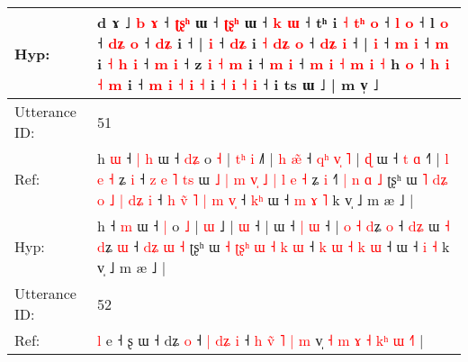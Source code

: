 \documentclass[10pt]{article}
\DeclareRobustCommand{\hl}[1]{{\textcolor{red}{#1}}}
\begin{document}
\begin{longtable}{ll}
Hyp: & d\hl{}\hl{}\hl{}\hl{}\hl{}\hl{} \hl{}ɤ\hl{}\hl{}\hl{}\hl{}\hl{}\hl{}\hl{}\hl{}\hl{}\hl{}\hl{}\hl{}\hl{} ˩\hl{}\hl{} \hl{b} \hl{}\hl{ɤ} ˧\hl{}\hl{}\hl{}\hl{}\hl{}\hl{}\hl{}\hl{} \hl{ʈ}\hl{ʂ}\hl{ʰ} ɯ ˧ \hl{ʈ}\hl{ʂ}\hl{ʰ} ɯ ˧ \hl{}\hl{k} \hl{ɯ} ˧\hl{}\hl{} tʰ i \hl{}\hl{˧} \hl{}\hl{t}\hl{ʰ} \hl{}\hl{o} ˧ \hl{l} \hl{o} ˧\hl{}\hl{} l \hl{o} ˧ \hl{d}\hl{ʑ} \hl{}\hl{o} ˧ \hl{d}\hl{ʑ} i ˧ | \hl{i} ˧ \hl{d}\hl{ʑ} i\hl{} \hl{˧} \hl{}\hl{d}\hl{ʑ} \hl{}\hl{o} ˧ \hl{d}\hl{ʑ} \hl{i} ˧ |\hl{}\hl{}\hl{}\hl{} \hl{i} ˧ \hl{m} \hl{i} ˧ \hl{m} i\hl{}\hl{} \hl{˧} \hl{h} \hl{i} ˧ \hl{}\hl{m} \hl{}\hl{i} ˧ z\hl{}\hl{} \hl{i} \hl{˧} \hl{m} i\hl{} ˧ \hl{m} \hl{i} ˧ \hl{m} \hl{i} \hl{˧} \hl{m} \hl{}\hl{i} \hl{˧} h\hl{}\hl{}\hl{}\hl{}\hl{}\hl{}\hl{}\hl{} \hl{o} ˧\hl{}\hl{} \hl{h} \hl{i} \hl{˧} \hl{m} i ˧ \hl{m} \hl{i} \hl{˧} \hl{i} \hl{}\hl{˧} i \hl{}\hl{˧} \hl{i} \hl{˧} \hl{i} ˧\hl{}\hl{} i\hl{}\hl{} ts ɯ ˩ | m v̩ ˩
 \\
\midrule
Utterance ID: & 51 \\
Ref: & h\hl{ }\hl{ɯ} ˧\hl{ }\hl{|} \hl{h} ɯ ˧ \hl{d}\hl{ʑ} o \hl{˧} |\hl{ }\hl{t}\hl{ʰ} \hl{i} ˩\hl{˥} |\hl{ }\hl{h} \hl{æ}\hl{̃} ˧\hl{ }\hl{q}\hl{ʰ}\hl{ }\hl{v}\hl{̩}\hl{ }\hl{˥} |\hl{ }\hl{ɖ} ɯ ˧ \hl{t} \hl{ɑ} ˧\hl{˥} | \hl{l} \hl{e} \hl{˧}\hl{ }ʑ \hl{i} ˧\hl{ }\hl{z}\hl{ }\hl{e}\hl{ }\hl{˥} \hl{t}\hl{s} ɯ\hl{ }\hl{˩}\hl{ }\hl{|}\hl{ }\hl{m}\hl{ }\hl{v}\hl{̩}\hl{ }\hl{˩}\hl{ }\hl{|}\hl{ }\hl{l} \hl{e} \hl{˧}\hl{ }ʑ \hl{i} ˧\hl{˥} \hl{|}\hl{ }\hl{n} \hl{ɑ} \hl{˩} ʈʂʰ ɯ \hl{˥} \hl{d}\hl{ʑ}\hl{ }\hl{o} \hl{˩} \hl{|} \hl{d}\hl{ʑ} \hl{i} ˧\hl{ }\hl{h} \hl{v}\hl{̃} \hl{˥} \hl{|} \hl{m} \hl{v}\hl{̩} ˧\hl{ }\hl{k}\hl{ʰ} ɯ ˧\hl{ }\hl{m} \hl{ɤ} \hl{˥} k v̩ ˩ m æ ˩ |
 \\
Hyp: & h\hl{}\hl{} ˧\hl{}\hl{} \hl{m} ɯ ˧ \hl{}\hl{|} o \hl{˩} |\hl{}\hl{}\hl{} \hl{ɯ} ˩\hl{} |\hl{}\hl{} \hl{}\hl{ɯ} ˧\hl{}\hl{}\hl{}\hl{}\hl{}\hl{}\hl{}\hl{} |\hl{}\hl{} ɯ ˧ \hl{|} \hl{ɯ} ˧\hl{} | \hl{o} \hl{˧} \hl{}\hl{d}ʑ \hl{o} ˧\hl{}\hl{}\hl{}\hl{}\hl{}\hl{} \hl{d}\hl{ʑ} ɯ\hl{}\hl{}\hl{}\hl{}\hl{}\hl{}\hl{}\hl{}\hl{}\hl{}\hl{}\hl{}\hl{}\hl{}\hl{} \hl{˧} \hl{}\hl{d}ʑ \hl{ɯ} ˧\hl{} \hl{}\hl{d}\hl{ʑ} \hl{ɯ} \hl{˧} ʈʂʰ ɯ \hl{˧} \hl{}\hl{ʈ}\hl{ʂ}\hl{ʰ} \hl{ɯ} \hl{˧} \hl{}\hl{k} \hl{ɯ} ˧\hl{}\hl{} \hl{}\hl{k} \hl{ɯ} \hl{˧} \hl{k} \hl{}\hl{ɯ} ˧\hl{}\hl{}\hl{} ɯ ˧\hl{}\hl{} \hl{i} \hl{˧} k v̩ ˩ m æ ˩ |
 \\
\midrule
Utterance ID: & 52 \\
Ref: & \hl{l} e ˧ \hl{}ʂ\hl{} ɯ ˧ dʑ \hl{o} ˧\hl{ }\hl{|} \hl{d}\hl{ʑ} \hl{i} ˧ \hl{h} \hl{v}\hl{̃} \hl{˥} \hl{|}\hl{ }\hl{m} v̩\hl{ }\hl{˧}\hl{ }\hl{m}\hl{ }\hl{ɤ}\hl{ }\hl{˧}\hl{ }\hl{k}\hl{ʰ}\hl{ }\hl{ɯ} \hl{˧}\hl{˥} |

\end{longtable}
\end{document}
